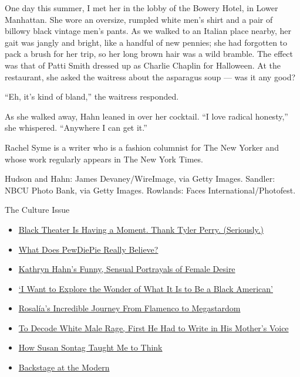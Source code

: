 One day this summer, I met her in the lobby of the Bowery Hotel, in
Lower Manhattan. She wore an oversize, rumpled white men's shirt and a
pair of billowy black vintage men's pants. As we walked to an Italian
place nearby, her gait was jangly and bright, like a handful of new
pennies; she had forgotten to pack a brush for her trip, so her long
brown hair was a wild bramble. The effect was that of Patti Smith
dressed up as Charlie Chaplin for Halloween. At the restaurant, she
asked the waitress about the asparagus soup --- was it any good?

``Eh, it's kind of bland,'' the waitress responded.

As she walked away, Hahn leaned in over her cocktail. ``I love radical
honesty,'' she whispered. ``Anywhere I can get it.''

Rachel Syme is a writer who is a fashion columnist for The New Yorker
and whose work regularly appears in The New York Times.

Hudson and Hahn: James Devaney/WireImage, via Getty Images. Sandler:
NBCU Photo Bank, via Getty Images. Rowlands: Faces
International/Photofest.

The Culture Issue

\begin{itemize}
\tightlist
\item
  \href{https://www.nytimes3xbfgragh.onion/interactive/2019/10/09/magazine/tyler-perry-black-theater.html}{Black
  Theater Is Having a Moment. Thank Tyler Perry. (Seriously.)}
\item
  \href{https://www.nytimes3xbfgragh.onion/interactive/2019/10/09/magazine/PewDiePie-interview.html}{What
  Does PewDiePie Really Believe?}
\item
  \href{https://www.nytimes3xbfgragh.onion/interactive/2019/10/09/magazine/kathryn-hahn-mrs-fletcher.html}{Kathryn
  Hahn's Funny, Sensual Portrayals of Female Desire}
\item
  \href{https://www.nytimes3xbfgragh.onion/interactive/2019/10/08/magazine/black-women-artists-conversation.html}{`I
  Want to Explore the Wonder of What It Is to Be a Black American'}
\item
  \href{https://www.nytimes3xbfgragh.onion/interactive/2019/10/08/magazine/rosalia-flamenco.html}{Rosalía's
  Incredible Journey From Flamenco to Megastardom}
\item
  \href{https://www.nytimes3xbfgragh.onion/interactive/2019/10/08/magazine/ben-lerner-topeka-school.html}{To
  Decode White Male Rage, First He Had to Write in His Mother's Voice}
\item
  \href{https://www.nytimes3xbfgragh.onion/interactive/2019/10/08/magazine/susan-sontag.html}{How
  Susan Sontag Taught Me to Think}
\item
  \href{https://www.nytimes3xbfgragh.onion/interactive/2019/10/09/magazine/moma-reopening.html}{Backstage
  at the Modern}
\end{itemize}


